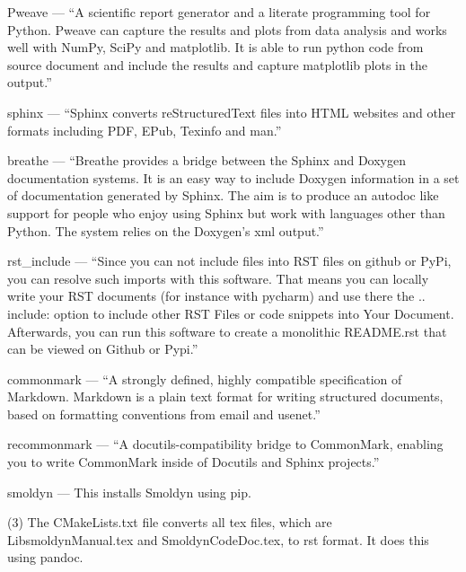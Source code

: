 \documentclass {scrbook}
\begin{document}
\begin{description}

\item{Pweave} --- ``A scientific report generator and a literate programming tool for Python. Pweave can capture the results and plots from data analysis and works well with NumPy, SciPy and matplotlib. It is able to run python code from source document and include the results and capture matplotlib plots in the output.''

\item{sphinx} --- ``Sphinx converts reStructuredText files into HTML websites and other formats including PDF, EPub, Texinfo and man.''

\item{breathe} --- ``Breathe provides a bridge between the Sphinx and Doxygen documentation systems. It is an easy way to include Doxygen information in a set of documentation generated by Sphinx. The aim is to produce an autodoc like support for people who enjoy using Sphinx but work with languages other than Python. The system relies on the Doxygen's xml output.''

\item{rst\_include} --- ``Since you can not include files into RST files on github or PyPi, you can resolve such imports with this software. That means you can locally write your RST documents (for instance with pycharm) and use there the .. include: option to include other RST Files or code snippets into Your Document. Afterwards, you can run this software to create a monolithic README.rst that can be viewed on Github or Pypi.''

\item{commonmark} --- ``A strongly defined, highly compatible specification of Markdown. Markdown is a plain text format for writing structured documents, based on formatting conventions from email and usenet.''

\item{recommonmark} --- ``A docutils-compatibility bridge to CommonMark, enabling you to write CommonMark inside of Docutils and Sphinx projects.''

\item{smoldyn} --- This installs Smoldyn using pip.

\end{description}

(3) The CMakeLists.txt file converts all tex files, which are LibsmoldynManual.tex and SmoldynCodeDoc.tex, to rst format. It does this using pandoc.
\end{document}

